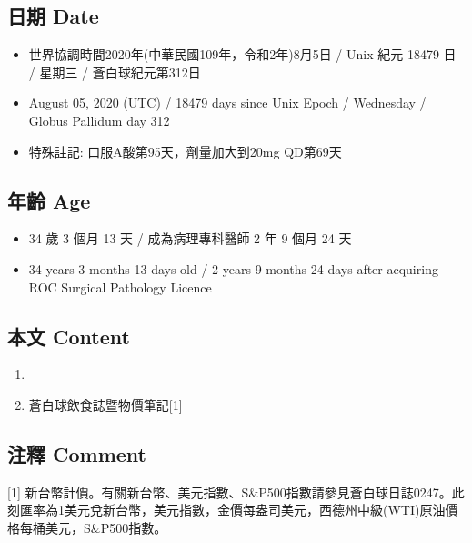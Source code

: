 \documentclass[
]{article}
\providecommand{\tightlist}{%
  \setlength{\itemsep}{0pt}\setlength{\parskip}{0pt}}
\begin{document}
\hypertarget{ux65e5ux671f-date-4}{%
\subsection{日期 Date}\label{ux65e5ux671f-date-4}}

\begin{itemize}
\tightlist
\item
  世界協調時間2020年(中華民國109年，令和2年)8月5日 / Unix 紀元 18479 日
  / 星期三 / 蒼白球紀元第312日
\item
  August 05, 2020 (UTC) / 18479 days since Unix Epoch / Wednesday /
  Globus Pallidum day 312
\item
  特殊註記: 口服A酸第95天，劑量加大到20mg QD第69天
\end{itemize}

\hypertarget{ux5e74ux9f61-age-4}{%
\subsection{年齡 Age}\label{ux5e74ux9f61-age-4}}

\begin{itemize}
\tightlist
\item
  34 歲 3 個月 13 天 / 成為病理專科醫師 2 年 9 個月 24 天
\item
  34 years 3 months 13 days old / 2 years 9 months 24 days after
  acquiring ROC Surgical Pathology Licence
\end{itemize}

\hypertarget{ux672cux6587-content-4}{%
\subsection{本文 Content}\label{ux672cux6587-content-4}}

\begin{enumerate}
\def\labelenumi{\arabic{enumi}.}
\tightlist
\item
\item
  蒼白球飲食誌暨物價筆記{[}1{]}
\end{enumerate}

\hypertarget{ux6ce8ux91cb-comment-4}{%
\subsection{注釋 Comment}\label{ux6ce8ux91cb-comment-4}}

{[}1{]}
新台幣計價。有關新台幣、美元指數、S\&P500指數請參見蒼白球日誌0247。此刻匯率為1美元兌新台幣，美元指數，金價每盎司美元，西德州中級(WTI)原油價格每桶美元，S\&P500指數。
\end{document}
